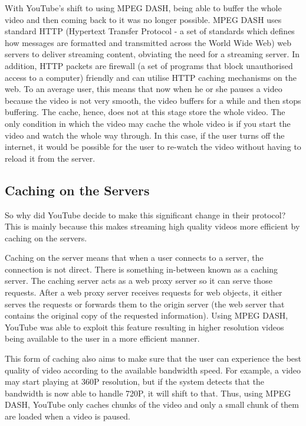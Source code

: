 With YouTube's shift to using MPEG DASH, being able to buffer the whole video and then coming back to it was no longer possible. MPEG DASH uses standard HTTP (Hypertext Transfer Protocol - a set of standards which defines how messages are formatted and transmitted across the World Wide Web) web servers to deliver streaming content, obviating the need for a streaming server. In addition, HTTP packets are firewall (a set of programs that block unauthorised access to a computer) friendly and can utilise HTTP caching mechanisms on the web. To an average user, this means that now when he or she pauses a video because the video is not very smooth, the video buffers for a while and then stops buffering. The cache, hence, does not at this stage store the whole video. The only condition in which the video may cache the whole video is if you start the video and watch the whole way through. In this case, if the user turns off the internet, it would be possible for the user to re-watch the video without having to reload it from the server.

\subsection{Caching on the Servers}
So why did YouTube decide to make this significant change in their protocol? This is mainly because this makes streaming high quality videos more efficient by caching on the servers.

Caching on the server means that when a user connects to a server, the connection is not direct. There is something in-between known as a caching server. The caching server acts as a web proxy server so it can serve those requests. After a web proxy server receives requests for web objects, it either serves the requests or forwards them to the origin server (the web server that contains the original copy of the requested information). Using MPEG DASH, YouTube was able to exploit this feature resulting in higher resolution videos being available to the user in a more efficient manner.

This form of caching also aims to make sure that the user can experience the best quality of video according to the available bandwidth speed. For example, a video may start playing at 360P resolution, but if the system detects that the bandwidth is now able to handle 720P, it will shift to that. Thus, using MPEG DASH, YouTube only caches chunks of the video and only a small chunk of them are loaded when a video is paused. 
